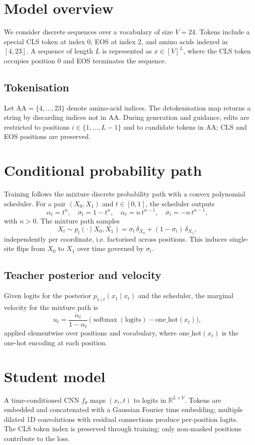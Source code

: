 
\section*{Model overview}
We consider discrete sequences over a vocabulary of size \(V=24\). Tokens include a special CLS token at index 0, EOS at index 2, and amino acids indexed in \([4,23]\). A sequence of length \(L\) is represented as \(x\in [V]^L\), where the CLS token occupies position 0 and EOS terminates the sequence.

\subsection*{Tokenisation}
Let \(\mathrm{AA} = \{4,\dots,23\}\) denote amino-acid indices. The detokenisation map returns a string by discarding indices not in \(\mathrm{AA}\). During generation and guidance, edits are restricted to positions \(i\in\{1,\dots,L-1\}\) and to candidate tokens in \(\mathrm{AA}\); CLS and EOS positions are preserved.

\section*{Conditional probability path}
Training follows the mixture discrete probability path with a convex polynomial scheduler. For a pair \((X_0,X_1)\) and \(t\in[0,1]\), the scheduler outputs
\[\alpha_t=t^n,\quad \sigma_t=1-t^n,\quad \dot\alpha_t=n\,t^{n-1},\quad \dot\sigma_t=-n\,t^{n-1},\]
with \(n>0\). The mixture path samples
\[X_t \sim p_t(\cdot\mid X_0,X_1) = \sigma_t\,\delta_{X_0} + (1-\sigma_t)\,\delta_{X_1},\]
independently per coordinate, i.e. factorised across positions. This induces single-site flips from \(X_0\) to \(X_1\) over time governed by \(\sigma_t\).

\subsection*{Teacher posterior and velocity}
Given logits for the posterior \(p_{1\mid t}(x_1\mid x_t)\) and the scheduler, the marginal velocity for the mixture path is
\[u_t = \frac{\dot\alpha_t}{1-\alpha_t}\,\big(\operatorname{softmax}(\mathrm{logits}) - \mathrm{one\_hot}(x_t)\big),\]
applied elementwise over positions and vocabulary, where \(\mathrm{one\_hot}(x_t)\) is the one-hot encoding at each position.

\section*{Student model}
A time-conditioned CNN \(f_\theta\) maps \((x_t,t)\) to logits in \(\mathbb{R}^{L\times V}\). Tokens are embedded and concatenated with a Gaussian Fourier time embedding; multiple dilated 1D convolutions with residual connections produce per-position logits. The CLS token index is preserved through training; only non-masked positions contribute to the loss.

